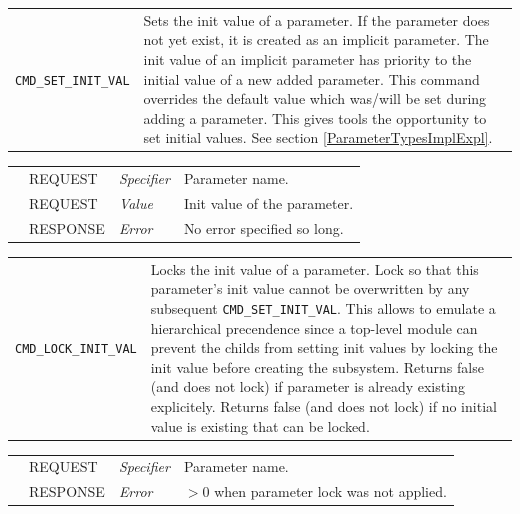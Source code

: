 \noindent
\begin{tabularx}{\textwidth}{|p{3.6cm}|X|}
	\cline{1-1}\cline{2-2}
	  \lstinline|CMD_SET_INIT_VAL| & Sets the init value of a parameter. If the parameter does not yet exist, it is created as an implicit parameter. The init value of an implicit parameter has priority to the initial value of a new added parameter. This command overrides the default value which was/will be set during adding a parameter. This gives tools the opportunity to set initial values. See section \ref{ParameterTypesImplExpl}. \\
\end{tabularx}
\begin{tabularx}{\textwidth}{|p{3.6cm}|p{2.3cm}|p{2cm}|X|}
	\cline{1-1}\cline{2-2}\cline{3-3}\cline{4-4}
	   &  REQUEST     &  {\em Specifier}   &  Parameter name.   \\
	\cline{1-1}\cline{2-2}\cline{3-3}\cline{4-4}                        &  REQUEST     &  {\em Value}     &  Init value of the parameter.   \\
	\cline{1-1}\cline{2-2}\cline{3-3}\cline{4-4}                        &  RESPONSE    &  {\em Error}    &  No error specified so long.\\
	\hline
\end{tabularx}

\vspace{1 cm}

\noindent
\begin{tabularx}{\textwidth}{|p{3.6cm}|X|}
	\cline{1-1}\cline{2-2}
	  \lstinline[breaklines=false]|CMD_LOCK_INIT_VAL| & Locks the init value of a parameter. Lock so that this parameter's init value cannot be overwritten by  any subsequent \lstinline|CMD_SET_INIT_VAL|. This allows to emulate a hierarchical
    precendence since a top-level module can prevent the childs from setting
    init values by locking the init value before creating the subsystem.\newline   
    Returns false (and does not lock) if parameter is already existing explicitely.\newline
    Returns false (and does not lock) if no initial value is existing that can be locked. \\
\end{tabularx}
\begin{tabularx}{\textwidth}{|p{3.6cm}|p{2.3cm}|p{2cm}|X|}
	\cline{1-1}\cline{2-2}\cline{3-3}\cline{4-4}
	   &  REQUEST     &  {\em Specifier}   &  Parameter name.   \\
	\cline{1-1}\cline{2-2}\cline{3-3}\cline{4-4}                        &  RESPONSE    &  {\em Error}    &  $>0$ when parameter lock was not applied.   \\
	\hline
\end{tabularx}

